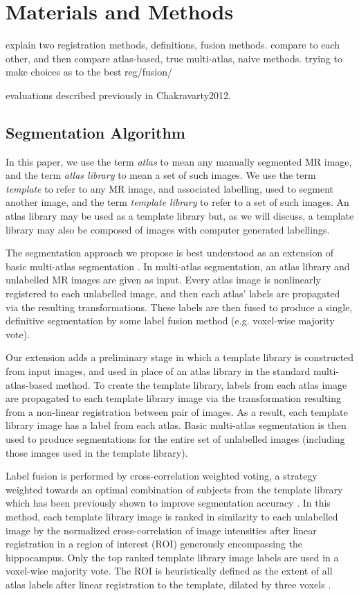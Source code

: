\documentclass{article}\usepackage{graphicx, color}
\newcommand{\marginnote}[1]{\-\marginpar[\raggedleft\footnotesize #1]{\raggedright\footnotesize #1}}
\newcommand{\todo}[1]{\marginnote{\textcolor{red}{TODO #1}}}
\begin{document}
\section{Materials and Methods}


explain two registration methods, definitions, fusion methods. 
compare to each other, and then compare atlas-based, true multi-atlas, naive methods.
trying to make choices as to the best reg/fusion/

evaluations
described previously in Chakravarty2012. 

\subsection{Segmentation Algorithm}
\todo{Make sure we explain what MAGeT stands for}
In this paper, we use the term {\it atlas} to mean any manually segmented MR
image, and the term {\it atlas library} to mean a set of such images.  We use
the term {\it template} to refer to any MR image, and associated labelling,
used to segment another image, and the term {\it template library} to refer to
a set of such images.  An atlas library may be used as a template library but,
as we will discuss, a template library may also be composed of images with
computer generated labellings. 

The segmentation approach we propose is best understood as an extension of
basic multi-atlas segmentation \citep{Collins2010}.  In multi-atlas segmentation,
an atlas library and unlabelled MR images are given as input.  Every atlas
image is nonlinearly registered to each unlabelled image, and then each atlas'
labels are propagated via the resulting transformations.  These labels are then
fused to produce a single, definitive segmentation by some label fusion method
(e.g.  voxel-wise majority vote). 

Our extension adds a preliminary stage in which a template library is
constructed from input images, and used in place of an atlas library in the
standard multi-atlas-based method.  To create the template library, labels from
each atlas image are propagated to each template library image via the
transformation resulting from a non-linear registration between pair of images.
As a result, each template library image has a label from each atlas.
Basic multi-atlas segmentation is then used to produce segmentations for the
entire set of unlabelled images (including those images used in the template
library). 

Label fusion is performed by cross-correlation weighted voting, a strategy
weighted towards an optimal combination of subjects from the template library
which has been previously shown to improve segmentation
accuracy \citep{Aljabar2009,Collins2010}. In this method, each template library
image is ranked in similarity to each unlabelled image by the normalized
cross-correlation of image intensities after linear registration in a region of
interest (ROI) generously encompassing the hippocampus.  Only the top ranked
template library image labels are used in a voxel-wise majority vote. The ROI
is heuristically defined as the extent of all atlas labels after linear
registration to the template, dilated by three voxels \citep{Chakravarty2012}.
\end{document}
